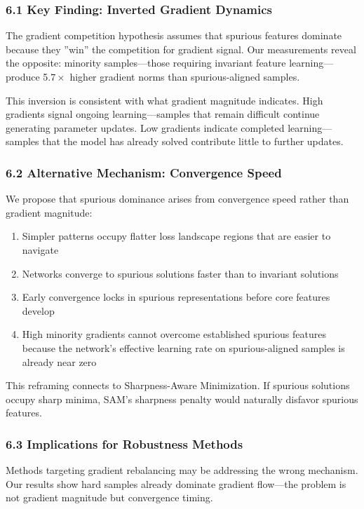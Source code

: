 
\subsubsection{6.1 Key Finding: Inverted Gradient Dynamics}

The gradient competition hypothesis assumes that spurious features dominate because they ''win'' the competition for gradient signal. Our measurements reveal the opposite: minority samples---those requiring invariant feature learning---produce 5.$7\times$ higher gradient norms than spurious-aligned samples.

This inversion is consistent with what gradient magnitude indicates. High gradients signal ongoing learning---samples that remain difficult continue generating parameter updates. Low gradients indicate completed learning---samples that the model has already solved contribute little to further updates.

\subsubsection{6.2 Alternative Mechanism: Convergence Speed}

We propose that spurious dominance arises from convergence speed rather than gradient magnitude:

\begin{enumerate}
\item Simpler patterns occupy flatter loss landscape regions that are easier to navigate
\item Networks converge to spurious solutions faster than to invariant solutions
\item Early convergence locks in spurious representations before core features develop
\item High minority gradients cannot overcome established spurious features because the network's effective learning rate on spurious-aligned samples is already near zero
\end{enumerate}

This reframing connects to Sharpness-Aware Minimization. If spurious solutions occupy sharp minima, SAM's sharpness penalty would naturally disfavor spurious features.

\subsubsection{6.3 Implications for Robustness Methods}

Methods targeting gradient rebalancing may be addressing the wrong mechanism. Our results show hard samples already dominate gradient flow---the problem is not gradient magnitude but convergence timing.

